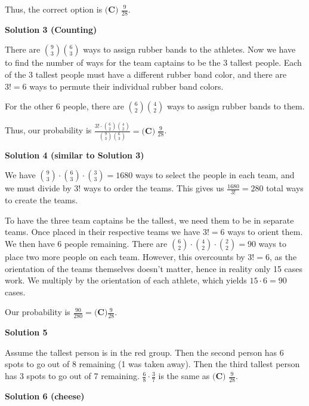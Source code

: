 \begin{enumerate}
 Thus, the correct option is $\boxed{\textbf{(C) }\frac{9}{28}}.$




\textbf{Solution 3 (Counting)}

There are $\binom{9}{3}\binom{6}{3}$ ways to assign rubber bands to the athletes. Now we have to find the number of ways for the team captains to be the 3 tallest people. Each of the 3 tallest people must have a different rubber band color, and there are $3! = 6$ ways to permute their individual rubber band colors.

 For the other 6 people, there are $\binom{6}{2}\binom{4}{2}$ ways to assign rubber bands to them. 

 Thus, our probability is $\frac{3! \cdot \binom{6}{2}\binom{4}{2}}{\binom{9}{3}\binom{6}{3}} = \boxed{\textbf{(C)}\hspace{3pt}\frac{9}{28}}$.

 



\textbf{Solution 4 (similar to Solution 3)}

We have $\binom{9}{3}\cdot \binom{6}{3}\cdot \binom{3}{3}=1680$ ways to select the people in each team, and we must divide by $3!$ ways to order the teams. This gives us $\frac{1680}{3!}=280$ total ways to create the teams.

 To have the three team captains be the tallest, we need them to be in separate teams. Once placed in their respective teams we have $3! = 6$ ways to orient them.  We then have 6 people remaining. There are $\binom{6}{2}\cdot \binom{4}{2}\cdot \binom{2}{2} = 90$ ways to place two more people on each team. However, this overcounts by $3!=6$, as the orientation of the teams themselves doesn't matter, hence in reality only 15 cases work. We multiply by the orientation of each athlete, which yields $15 \cdot 6 = 90$ cases.

 Our probability is $\frac{90}{280} = \boxed{\textbf{(C)} \frac{9}{28}}$.

 



\textbf{Solution 5}

Assume the tallest person is in the red group. Then the second person has 6 spots to go out of 8 remaining (1 was taken away). Then the third tallest person has 3 spots to go out of 7 remaining. $\frac{6}{8} \cdot \frac{3}{7}$ is the same as $\boxed{\textbf{(C) }\frac{9}{28}}.$




\textbf{Solution 6 (cheese)}


\end{enumerate}

